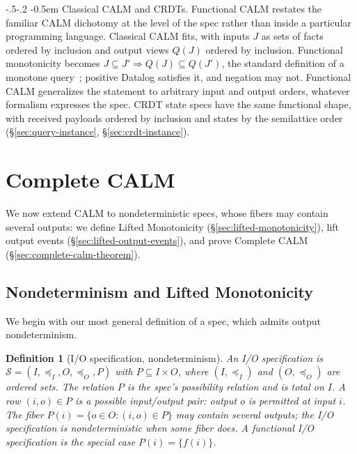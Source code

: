 \documentclass[sigconf]{cidr-2027}
\makeatletter
\newtheorem{definition}{Definition}
\theoremstyle{remark}
\renewcommand\paragraph{\@startsection{paragraph}{4}{\z@}%
  {-.5\baselineskip \@plus -2\p@ \@minus -.2\p@}%
  {-0.5em}%
  {\normalfont\bfseries}}
\newcommand{\InputOrd}{\preceq_I}
\newcommand{\OutputOrd}{\preceq_O}
\newcommand{\Spec}{\mathcal{S}}
\newcommand{\spectype}[1][]{I/O specification#1\xspace}
\newcommand{\Spectype}[1][]{I/O specification#1\xspace}
\newcommand{\fiber}[1]{P(#1)}
\makeatother
\begin{document}
\paragraph{Classical CALM and CRDTs.}
Functional CALM restates the familiar CALM dichotomy at the level of the spec
rather than inside a particular programming language.
Classical CALM fits, with inputs $J$ as sets of facts ordered by
inclusion and output views $Q(J)$ ordered by inclusion.  Functional
monotonicity becomes $J\subseteq J'\Rightarrow Q(J)\subseteq Q(J')$,
the standard definition of a monotone query~\cite{abiteboul1995foundations};
positive Datalog satisfies it, and negation may not.  Functional CALM
generalizes the statement to arbitrary input and
output orders, whatever formalism expresses the spec.  CRDT state specs have the same functional shape,
with received payloads ordered by inclusion and states by the semilattice
order~\cite{shapiro2011crdt} (\S\ref{sec:query-instance},
\S\ref{sec:crdt-instance}).

\section{Complete CALM}
\label{sec:complete-calm}

We now extend CALM to nondeterministic specs, whose fibers may contain several outputs: we define Lifted Monotonicity (\S\ref{sec:lifted-monotonicity}), lift output events (\S\ref{sec:lifted-output-events}), and prove Complete CALM (\S\ref{sec:complete-calm-theorem}).

\subsection{Nondeterminism and Lifted Monotonicity}
\label{sec:ambiguity-story}
\label{sec:relational-specifications}
\label{sec:lifted-monotonicity}

We begin with our most general definition of a spec, which admits
output nondeterminism.
\begin{definition}[\Spectype, nondeterminism]
\label{def:relational-specification}
An \emph{\spectype} is
$\Spec=(I,\InputOrd,O,\OutputOrd,P)$ with $P\subseteq I\times O$,
where $(I,\InputOrd)$ and $(O,\OutputOrd)$ are ordered sets.  The
relation $P$ is the spec's \emph{possibility relation} and is total
on $I$.  A row $(i,o)\in P$ is a possible input/output pair: output $o$ is
permitted at input $i$.  The fiber
$\fiber{i}=\{o\in O:(i,o)\in P\}$ may contain several
outputs; the \spectype is \emph{nondeterministic} when some fiber does.  A
functional \spectype is the special case $\fiber{i}=\{f(i)\}$.
\end{definition}
\end{document}
